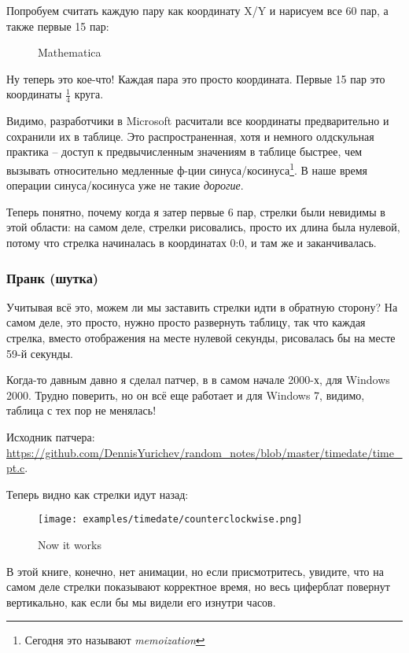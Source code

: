 Попробуем считать каждую пару как координату X/Y и нарисуем все 60 пар, а также первые 15 пар:

\begin{figure}[H]
\centering
{}
\caption{Mathematica}
\end{figure}

Ну теперь это кое-что!
Каждая пара это просто координата.
Первые 15 пар это координаты $\frac{1}{4}$ круга.

Видимо, разработчики в Microsoft расчитали все координаты предварительно и сохранили их в таблице.
Это распространенная, хотя и немного олдскульная практика -- доступ к предвычисленным значениям в таблице быстрее, чем вызывать относительно медленные ф-ции
синуса/косинуса\footnote{Сегодня это называют \emph{memoization}}.
В наше время операции синуса/косинуса уже не такие \emph{дорогие}.

Теперь понятно, почему когда я затер первые 6 пар, стрелки были невидимы в этой области: на самом деле, стрелки рисовались,
просто их длина была нулевой, потому что стрелка начиналась в координатах 0:0, и там же и заканчивалась.

\subsubsection{Пранк (шутка)}

Учитывая всё это, можем ли мы заставить стрелки идти в обратную сторону?
На самом деле, это просто, нужно просто развернуть таблицу, так что каждая стрелка,
вместо отображения на месте нулевой секунды, рисовалась бы на месте 59-й секунды.

Когда-то давным давно я сделал патчер, в в самом начале 2000-х, для Windows 2000.
Трудно поверить, но он всё еще работает и для Windows 7, видимо, таблица с тех пор не менялась!

Исходник патчера: \url{https://github.com/DennisYurichev/random_notes/blob/master/timedate/time_pt.c}.

Теперь видно как стрелки идут назад:

\begin{figure}[H]
\centering
\texttt{[image: examples/timedate/counterclockwise.png]}
\caption{Now it works}
\end{figure}

В этой книге, конечно, нет анимации, но если присмотритесь, увидите, что на самом деле стрелки показывают корректное время,
но весь циферблат повернут вертикально, как если бы мы видели его изнутри часов.

